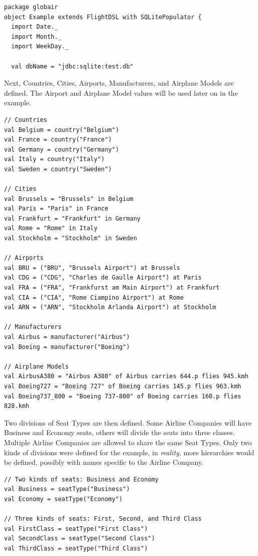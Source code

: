 \documentclass[a4paper]{article}
\begin{document}
\begin{lstlisting}
package globair
object Example extends FlightDSL with SQLitePopulator {
  import Date._
  import Month._
  import WeekDay._

  val dbName = "jdbc:sqlite:test.db"
\end{lstlisting}

Next, Countries, Cities, Airports, Manufacturers, and Airplane Models are defined.
The Airport and Airplane Model values will be used later on in the example.

\begin{lstlisting}
// Countries
val Belgium = country("Belgium")
val France = country("France")
val Germany = country("Germany")
val Italy = country("Italy")
val Sweden = country("Sweden")

// Cities
val Brussels = "Brussels" in Belgium
val Paris = "Paris" in France
val Frankfurt = "Frankfurt" in Germany
val Rome = "Rome" in Italy
val Stockholm = "Stockholm" in Sweden

// Airports
val BRU = ("BRU", "Brussels Airport") at Brussels
val CDG = ("CDG", "Charles de Gaulle Airport") at Paris
val FRA = ("FRA", "Frankfurst am Main Airport") at Frankfurt
val CIA = ("CIA", "Rome Ciampino Airport") at Rome
val ARN = ("ARN", "Stockholm Arlanda Airport") at Stockholm

// Manufacturers
val Airbus = manufacturer("Airbus")
val Boeing = manufacturer("Boeing")

// Airplane Models
val AirbusA380 = "Airbus A380" of Airbus carries 644.p flies 945.kmh
val Boeing727 = "Boeing 727" of Boeing carries 145.p flies 963.kmh
val Boeing737_800 = "Boeing 737-800" of Boeing carries 160.p flies 828.kmh
\end{lstlisting}

Two divisions of Seat Types are then defined.
Some Airline Companies will have Business and Economy seats, others will divide the seats into three classes.
Multiple Airline Companies are allowed to share the same Seat Types.
Only two kinds of divisions were defined for the example, in \emph{reality}, more hierarchies would be defined, possibly with names specific to the Airline Company.

\begin{lstlisting}
// Two kinds of seats: Business and Economy
val Business = seatType("Business")
val Economy = seatType("Economy")

// Three kinds of seats: First, Second, and Third Class
val FirstClass = seatType("First Class")
val SecondClass = seatType("Second Class")
val ThirdClass = seatType("Third Class")
\end{lstlisting}
\end{document}
